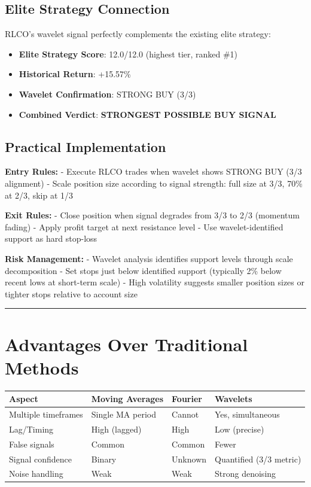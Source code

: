\documentclass[
  11pt,
]{article}
\providecommand{\tightlist}{%
  \setlength{\itemsep}{0pt}\setlength{\parskip}{0pt}}\usepackage{longtable,booktabs,array}
\begin{document}
\subsection{Elite Strategy Connection}\label{elite-strategy-connection}

RLCO's wavelet signal perfectly complements the existing elite strategy:

\begin{itemize}
\tightlist
\item
  \textbf{Elite Strategy Score}: 12.0/12.0 (highest tier, ranked \#1)
\item
  \textbf{Historical Return}: +15.57\%
\item
  \textbf{Wavelet Confirmation}: STRONG BUY (3/3)
\item
  \textbf{Combined Verdict}: \textbf{STRONGEST POSSIBLE BUY SIGNAL}
\end{itemize}

\subsection{Practical Implementation}\label{practical-implementation}

\textbf{Entry Rules:} - Execute RLCO trades when wavelet shows STRONG
BUY (3/3 alignment) - Scale position size according to signal strength:
full size at 3/3, 70\% at 2/3, skip at 1/3

\textbf{Exit Rules:} - Close position when signal degrades from 3/3 to
2/3 (momentum fading) - Apply profit target at next resistance level -
Use wavelet-identified support as hard stop-loss

\textbf{Risk Management:} - Wavelet analysis identifies support levels
through scale decomposition - Set stops just below identified support
(typically 2\% below recent lows at short-term scale) - High volatility
suggests smaller position sizes or tighter stops relative to account
size

\begin{center}\rule{0.5\linewidth}{0.5pt}\end{center}

\section{Advantages Over Traditional
Methods}\label{advantages-over-traditional-methods}

\begin{longtable}[]{@{}llll@{}}
\toprule\noalign{}
Aspect & Moving Averages & Fourier & Wavelets \\
\midrule\noalign{}
\endhead
\bottomrule\noalign{}
\endlastfoot
Multiple timeframes & Single MA period & Cannot & Yes, simultaneous \\
Lag/Timing & High (lagged) & High & Low (precise) \\
False signals & Common & Common & Fewer \\
Signal confidence & Binary & Unknown & Quantified (3/3 metric) \\
Noise handling & Weak & Weak & Strong denoising \\
\end{longtable}
\end{document}
